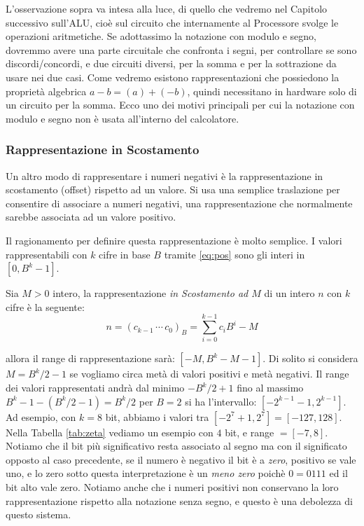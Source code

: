 L'osservazione sopra va intesa alla luce, di quello che vedremo nel Capitolo successivo sull'ALU, cioè sul circuito che internamente al Processore svolge le
operazioni aritmetiche. Se adottassimo la notazione con modulo e segno, dovremmo avere una parte circuitale che confronta i segni, per controllare se
sono discordi/concordi, e due circuiti diversi, per la somma e per la sottrazione da usare nei due casi. Come vedremo esistono
rappresentazioni che possiedono la proprietà algebrica $a-b = (a)+(-b)$,
quindi necessitano in hardware solo di un circuito per la somma. Ecco
uno dei motivi principali per cui la notazione con modulo e segno non è usata all'interno del calcolatore.

\subsubsection{Rappresentazione in Scostamento}\label{sec:offset}

Un altro modo di rappresentare i numeri negativi è la rappresentazione in scostamento (offset) rispetto ad un valore. Si usa una semplice traslazione
per consentire di associare a numeri negativi, una rappresentazione che normalmente sarebbe associata ad un valore positivo.

Il ragionamento per definire questa rappresentazione è molto semplice. I valori
rappresentabili con $k$ cifre in base $B$ tramite \eqref{eq:pos} sono gli interi in $[0,B^k-1]$. 

\begin{defn}
Sia $M > 0$ intero, la rappresentazione \emph{in Scostamento ad $M$} di un intero $n$ con $k$ cifre è la seguente:
\[  n = (c_{k-1}\,\cdots\,c_{0})_B = \sum_{i=0}^{k-1} c_iB^i - M \]
\end{defn}

\noindent allora il range di rappresentazione sarà: $[-M,B^k-M-1]$. Di solito
si considera $M = B^k/2-1$ se vogliamo circa metà di valori positivi e metà
negativi. Il range dei valori rappresentati andrà dal minimo $-B^k/2+1$ fino al
massimo $B^k-1-(B^k/2-1) = B^k/2$ per $B=2$ si ha l'intervallo:
$[-2^{k-1}-1,2^{k-1}]$. Ad esempio, con $k = 8$ bit, abbiamo i valori tra
$[-2^7+1,2^7] = [-127,128]$. Nella Tabella \ref{tab:zeta} vediamo un esempio con $4$
bit, e range $= [-7,8]$. Notiamo che il bit più significativo resta associato
al segno ma con il significato opposto al caso precedente, se il numero è
negativo il bit è a \emph{zero}, positivo se vale uno, e lo zero sotto questa
interpretazione è un \emph{meno zero} poichè $0 = 0111$ ed il bit alto vale
zero. Notiamo anche che i numeri positivi non conservano la loro
rappresentazione rispetto alla notazione senza segno, e questo è una debolezza
di questo sistema.\medskip


